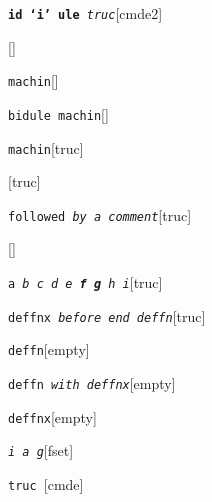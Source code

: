 \documentclass{book}
\begin{document}
\begin{titlepage}
%
\noindent\texttt{\textbf{id `\texttt{i}' ule} \bgroup{}\normalfont{}\textsl{truc}\egroup{}}\hfill[cmde2]



%
\noindent\texttt{}\hfill[]



\noindent\texttt{machin}\hfill[]



%
\noindent\texttt{bidule machin}\hfill[]



%
\noindent\texttt{machin}\hfill[truc]



%
\noindent\texttt{}\hfill[truc]



\noindent\texttt{followed \bgroup{}\normalfont{}\textsl{by a comment}\egroup{}}\hfill[truc]



%
\noindent\texttt{}\hfill[]



\noindent\texttt{a \bgroup{}\normalfont{}\textsl{b c d e \textbf{f g} h i}\egroup{}}\hfill[truc]



%
\noindent\texttt{deffnx \bgroup{}\normalfont{}\textsl{before end deffn}\egroup{}}\hfill[truc]



%


\noindent\texttt{deffn}\hfill[empty]



%

\noindent\texttt{deffn \bgroup{}\normalfont{}\textsl{with deffnx}\egroup{}}\hfill[empty]



%
\noindent\texttt{deffnx}\hfill[empty]



%

\noindent\texttt{\textsl{i} \bgroup{}\normalfont{}\textsl{a g}\egroup{}}\hfill[fset]



%
\noindent\texttt{truc \bgroup{}\normalfont{}\textsl{}\egroup{}}\hfill[cmde]




\end{titlepage}
\end{document}
